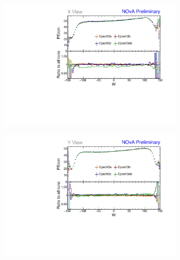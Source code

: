 \begin{figure}[!hbtp]
\centering
\begin{subfigure}[b]{0.495\textwidth}
\centering
\includegraphics[width=\textwidth]{Plots/TBCalibration/Attenprofs_P3Data_WPE_corr_xy_X_Combined.pdf}
\end{subfigure}
\begin{subfigure}[b]{0.495\textwidth}
\centering
\includegraphics[width=\textwidth]{Plots/TBCalibration/Attenprofs_P3Data_WPE_corr_xy_Y_Combined.pdf}
\end{subfigure}
\begin{subfigure}[b]{0.495\textwidth}
\centering

\end{subfigure}
\end{figure}
